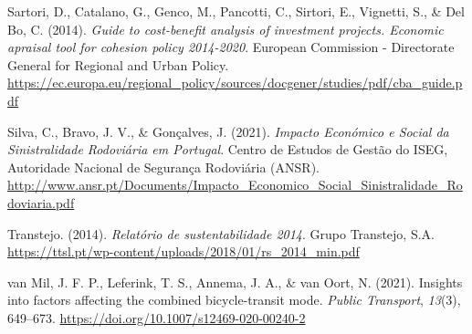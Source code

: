 \documentclass[review, doubleblind, 3p,
authoryear]{elsarticle} %
\newlength{\cslhangindent}
\newlength{\cslentryspacingunit} %
\newenvironment{CSLReferences}[2] %
 {%
  \setlength{\parindent}{0pt}
  \ifodd #1
  \let\oldpar\par
  \def\par{\hangindent=\cslhangindent\oldpar}
  \fi
  \setlength{\parskip}{#2\cslentryspacingunit}
 }%
 {}
\begin{document}
\begin{CSLReferences}{1}{0}
\leavevmode{}%
Sartori, D., Catalano, G., Genco, M., Pancotti, C., Sirtori, E.,
Vignetti, S., \& Del Bo, C. (2014). \emph{Guide to cost-benefit analysis
of investment projects. Economic apraisal tool for cohesion policy
2014-2020}. {European Commission - Directorate General for Regional and
Urban Policy}.
\url{https://ec.europa.eu/regional_policy/sources/docgener/studies/pdf/cba_guide.pdf}

\leavevmode{}%
Silva, C., Bravo, J. V., \& Gonçalves, J. (2021). \emph{{Impacto
Económico e Social da Sinistralidade Rodoviária em Portugal}}. {Centro
de Estudos de Gestão do ISEG, Autoridade Nacional de Segurança
Rodoviária (ANSR)}.
\url{http://www.ansr.pt/Documents/Impacto_Economico_Social_Sinistralidade_Rodoviaria.pdf}

\leavevmode{}%
Transtejo. (2014). \emph{Relatório de sustentabilidade 2014}. {Grupo
Transtejo, S.A.}
\url{https://ttsl.pt/wp-content/uploads/2018/01/rs_2014_min.pdf}

\leavevmode{}%
van Mil, J. F. P., Leferink, T. S., Annema, J. A., \& van Oort, N.
(2021). Insights into factors affecting the combined bicycle-transit
mode. \emph{Public Transport}, \emph{13}(3), 649--673.
\url{https://doi.org/10.1007/s12469-020-00240-2}

\end{CSLReferences}
\end{document}

